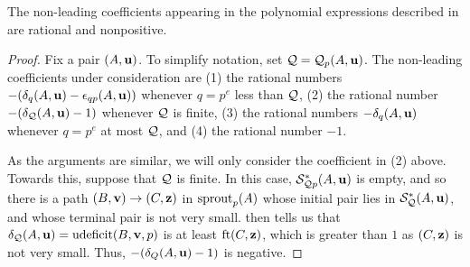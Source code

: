 \documentclass[11pt]{amsart}
\newcommand{\udeficit}{\operatorname{udeficit}}
\renewcommand{\S}{\mathcal{S}}
\begin{document}
\begin{corollary}
\label{non-leading coefficients: C}
The non-leading coefficients appearing in the polynomial expressions described in  are rational and nonpositive.
\end{corollary}

\begin{proof}  Fix a pair $(A,\mathbf{u})$.  To simplify notation, set $\mathcal{Q}=\mathcal{Q}_p(A,\mathbf{u})$.
The non-leading coefficients under consideration are (1) the rational numbers $-(\delta_{q}(A,\mathbf{u})-\epsilon_{qp}(A,\mathbf{u}))$ whenever $q=p^e$ less than $\mathcal{Q}$, (2) the rational number $-(\delta_{\mathcal{Q}}(A,\mathbf{u}) - 1)$ whenever $\mathcal{Q}$ is finite, (3) the rational numbers $-\delta_q(A,\mathbf{u})$ whenever $q=p^e$ at most $\mathcal{Q}$, and (4) the rational number $-1$.

As the arguments are similar, we will only consider the coefficient in (2) above.  Towards this, suppose that $\mathcal{Q}$ is finite.  In this case, $\S^{\ast}_{\Q p}(A,\vv{u})$ is empty, and so there is a path $(B,\mathbf{v}) \to (C,\mathbf{z})$ in $\operatorname{sprout}_p(A)$ whose initial pair lies in $\S^{\ast}_{\Q}(A,\vv{u})$, and whose terminal pair is not very small.  then tells us that 
$\delta_{\Q}(A,\vv{u}) = \udeficit(B,\vv{v},p)$ is at least $\operatorname{ft}(C, \mathbf{z})$, which is greater than $1$ as $(C,\mathbf{z})$ is not very small.  Thus, $-(\delta_Q(A,\mathbf{u})-1)$ is negative.
\end{proof}
\end{document}
